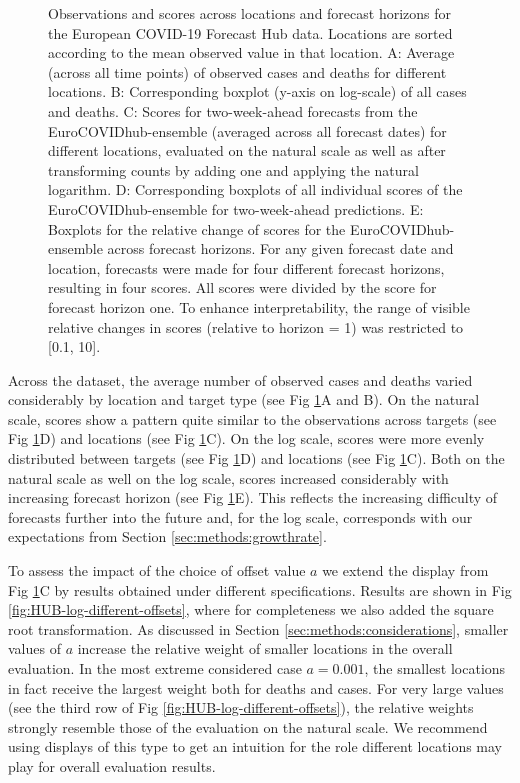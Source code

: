 \documentclass[10pt,letterpaper]{article}
\begin{document}
\begin{figure}[h!]
    \centering
    \caption{Observations and scores across locations and forecast horizons for the European COVID-19 Forecast Hub data. Locations are sorted according to the mean observed value in that location. 
    A: Average (across all time points) of observed cases and deaths for different locations. B: Corresponding boxplot (y-axis on log-scale) of all cases and deaths. C: Scores for two-week-ahead forecasts from the EuroCOVIDhub-ensemble (averaged across all forecast dates) for different locations, evaluated on the natural scale as well as after transforming counts by adding one and applying the natural logarithm. D: Corresponding boxplots of all individual scores of the EuroCOVIDhub-ensemble for two-week-ahead predictions. E: Boxplots for the relative change of scores for the EuroCOVIDhub-ensemble across forecast horizons. For any given forecast date and location, forecasts were made for four different forecast horizons, resulting in four scores. All scores were divided by the score for forecast horizon one. To enhance interpretability, the range of visible relative changes in scores (relative to horizon = 1) was restricted to [0.1, 10].}
    \label{fig:HUB-mean-locations}
\end{figure}

Across the dataset, the average number of observed cases and deaths varied considerably by location and target type (see Fig \ref{fig:HUB-mean-locations}A and B). On the natural scale, scores show a pattern quite similar to the observations across targets (see Fig \ref{fig:HUB-mean-locations}D) and locations (see Fig \ref{fig:HUB-mean-locations}C). On the log scale, scores were more evenly distributed between targets (see Fig \ref{fig:HUB-mean-locations}D) and locations (see Fig \ref{fig:HUB-mean-locations}C). Both on the natural scale as well on the log scale, scores increased considerably with increasing forecast horizon (see Fig \ref{fig:HUB-mean-locations}E). This reflects the increasing difficulty of forecasts further into the future and, for the log scale, corresponds with our expectations from Section \ref{sec:methods:growthrate}. 

To assess the impact of the choice of offset value $a$ we extend the display from Fig \ref{fig:HUB-mean-locations}C by results obtained under different specifications. Results are shown in Fig \ref{fig:HUB-log-different-offsets}, where for completeness we also added the square root transformation. As discussed in Section \ref{sec:methods:considerations}, smaller values of $a$ increase the relative weight of smaller locations in the overall evaluation. In the most extreme considered case $a = 0.001$, the smallest locations in fact receive the largest weight both for deaths and cases. For very large values (see the third row of Fig \ref{fig:HUB-log-different-offsets}), the relative weights strongly resemble those of the evaluation on the natural scale. We recommend using displays of this type to get an intuition for the role different locations may play for overall evaluation results.
\end{document}
